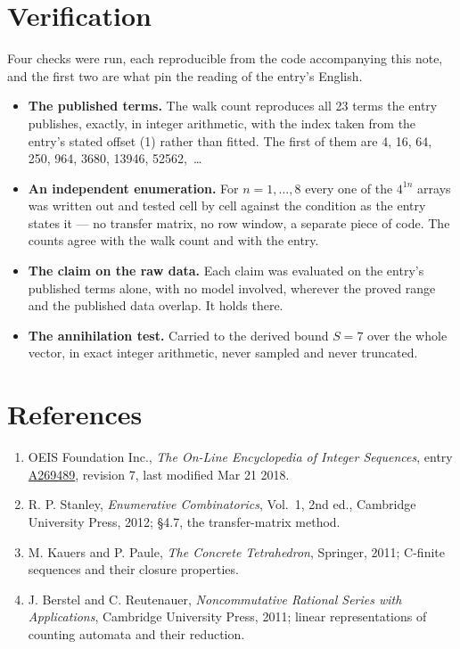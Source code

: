 \documentclass[11pt]{article}
\theoremstyle{definition}
\begin{document}
\section{Verification}

Four checks were run, each reproducible from the code accompanying this note, and the first two are what pin the reading of the entry's English.

\begin{itemize}

\item {\bfseries The published terms.} The walk count reproduces all 23 terms the entry publishes, exactly, in integer arithmetic, with the index taken from the entry's stated offset (1) rather than fitted. The first of them are 4, 16, 64, 250, 964, 3680, 13946, 52562,~\dots

\item {\bfseries An independent enumeration.} For $n = 1,\dots,8$ every one of the $4^{1n}$ arrays was written out and tested cell by cell against the condition as the entry states it --- no transfer matrix, no row window, a separate piece of code. The counts agree with the walk count and with the entry.

\item {\bfseries The claim on the raw data.} Each claim was evaluated on the entry's published terms alone, with no model involved, wherever the proved range and the published data overlap. It holds there.

\item {\bfseries The annihilation test.} Carried to the derived bound $S = 7$ over the whole vector, in exact integer arithmetic, never sampled and never truncated.

\end{itemize}

\section{References}

\begin{enumerate}

\item OEIS Foundation Inc., \emph{The On-Line Encyclopedia of Integer Sequences}, entry \href{https://oeis.org/A269489}{A269489}, revision 7, last modified Mar 21 2018.

\item R. P. Stanley, \emph{Enumerative Combinatorics}, Vol.~1, 2nd ed., Cambridge University Press, 2012; \S4.7, the transfer-matrix method.

\item M. Kauers and P. Paule, \emph{The Concrete Tetrahedron}, Springer, 2011; C-finite sequences and their closure properties.

\item J. Berstel and C. Reutenauer, \emph{Noncommutative Rational Series with Applications}, Cambridge University Press, 2011; linear representations of counting automata and their reduction.

\end{enumerate}
\end{document}
